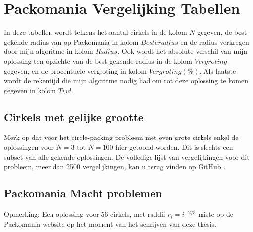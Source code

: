 \documentclass[12pt,a4paper,oneside]{book}
\begin{document}
\chapter{Packomania Vergelijking Tabellen} \label{append:packomania-tabellen}

In deze tabellen wordt telkens het aantal cirkels in de kolom $N$ gegeven, de best gekende radius van op Packomania in kolom $Beste radius$ en de radius verkregen door mijn algoritme in kolom $Radius$.
Ook wordt het absolute verschil van mijn oplossing ten opzichte van de best gekende radius in de kolom $Vergroting$ gegeven, en de procentuele vergroting in kolom $Vergroting (\%)$.
Als laatste wordt de rekentijd die mijn algoritme nodig had om tot deze oplossing te komen gegeven in kolom $Tijd$.

\section{Cirkels met gelijke grootte} \label{append:packomania-tabellen-gelijke-grootte}

Merk op dat voor het circle-packing probleem met even grote cirkels enkel de oplossingen voor $N=3$ tot $N=100$ hier getoond worden.
Dit is slechts een subset van alle gekende oplossingen.
De volledige lijst van vergelijkingen voor dit probleem, meer dan 2500 vergelijkingen, kan u terug vinden op GitHub \cite{packomania-tables-github}.

 \label{table:packomania-equal}

\section{Packomania Macht problemen} \label{append:packomania-tabellen-macht}

 \label{table:packomania-i}

 \label{table:packomania-i^1/2}

 \label{table:packomania-i^-1/5}

 \label{table:packomania-i^-1/2}

 \label{table:packomania-i^-2/3}

Opmerking: Een oplossing voor 56 cirkels, met raddii $r_i=i^{-2/3}$ miste op de Packomania website op het moment van het schrijven van deze thesis.
\end{document}
